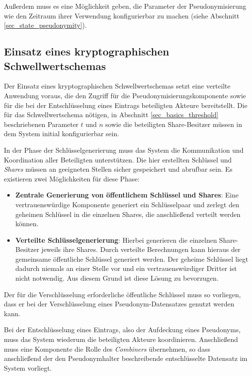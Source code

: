 Außerdem muss es eine Möglichkeit geben, die Parameter der Pseudonymisierung wie den Zeitraum ihrer Verwendung konfigurierbar zu machen (siehe Abschnitt \ref{sec_state_pseudonymity}).

\subsection{Einsatz eines kryptographischen Schwellwertschemas}

\label{subsec_impl_requirements_threshold}


Der Einsatz eines kryptographischen Schwellwertschemas setzt eine verteilte Anwendung voraus, die den Zugriff für die Pseudonymisierungskomponente sowie für die bei der Entschlüsselung eines Eintrags beteiligten Akteure bereitstellt. Die für das Schwellwertschema nötigen, in Abschnitt \ref{sec_basics_threshold} beschriebenen Parameter \(t\) und \(n\)  sowie die beteiligten Share-Besitzer müssen in dem System initial konfigurierbar sein.

In der Phase der Schlüsselgenerierung muss das System die Kommunikation und Koordination aller Beteiligten unterstützen. Die hier erstellten Schlüssel und \textit{Shares} müssen an geeigneten Stellen sicher gespeichert und abrufbar sein. Es existieren zwei Möglichkeiten für diese Phase:
\begin{itemize}
  \item \textbf{Zentrale Generierung von öffentlichem Schlüssel und Shares}: Eine vertrauenswürdige Komponente generiert ein Schlüsselpaar und zerlegt den geheimen Schlüssel in die einzelnen Shares, die anschließend verteilt werden können. 
  \item \textbf{Verteilte Schlüsselgenerierung}: Hierbei generieren die einzelnen Share-Besitzer jeweils ihre Shares. Durch verteilte Berechnungen kann hieraus der gemeinsame öffentliche Schlüssel generiert werden. Der geheime Schlüssel liegt dadurch niemals an einer Stelle vor und ein vertrauenswürdiger Dritter ist nicht notwendig. Aus diesem Grund ist diese Lösung zu bevorzugen.
\end{itemize}

Der für die Verschlüsselung erforderliche öffentliche Schlüssel muss so vorliegen, dass er bei der Verschlüsselung eines Pseudonym-Datensatzes genutzt werden kann.

Bei der Entschlüsselung eines Eintrags, also der Aufdeckung eines Pseudonyms, muss das System wiederum die beteiligten Akteure koordinieren. Anschließend muss eine Komponente die Rolle des \textit{Combiners} übernehmen, so dass anschließend der den Pseudonymhalter beschreibende entschlüsselte Datensatz im System  vorliegt.

